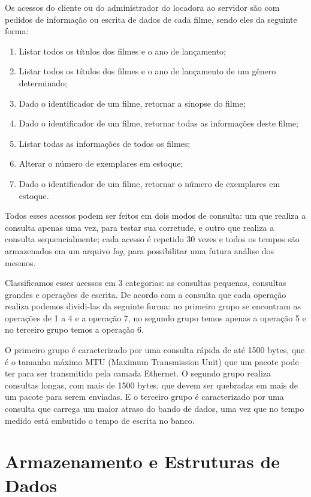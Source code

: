 \documentclass[12pt,a4paper]{article}
\newenvironment{myenumerate}{
\begin{enumerate}
 \setlength{\itemsep}{1pt}
 \setlength{\parskip}{0pt}
 \setlength{\parsep}{0pt}
}{\end{enumerate}}
\begin{document}
Os acessos do cliente ou do administrador do locadora ao servidor são com pedidos de informação ou escrita de dados de cada filme, sendo eles da seguinte forma:

\begin {myenumerate}
\item Listar todos os títulos dos filmes e o ano de lançamento;
\item Listar todos os títulos dos filmes e o ano de lançamento de um gênero determinado;
\item Dado o identificador de um filme, retornar a sinopse do filme;
\item Dado o identificador de um filme, retornar todas as informações deste filme;
\item Listar todas as informações de todos os filmes;
\item Alterar o número de exemplares em estoque;
\item Dado o identificador de um filme, retornar o número de exemplares
em estoque.
\end{myenumerate}

    Todos esses acessos podem ser feitos em dois modos de consulta: um que realiza a consulta apenas uma vez, para testar sua corretude, e outro que realiza a consulta sequencialmente; cada acesso é repetido 30 vezes e todos os tempos são armazenados em um arquivo {\it log}, para possibilitar uma futura análise dos mesmos.
    
    Classificamos esses acessos em 3 categorias: as consultas pequenas, consultas grandes e operações de escrita. De acordo com a consulta que cada operação realiza podemos dividi-las da seguinte forma: no primeiro grupo se encontram as operações de 1 a 4 e a operação 7, no segundo grupo temos apenas a operação 5 e no terceiro grupo temos a operação 6. 
    
O primeiro grupo é caracterizado por uma consulta rápida de até 1500 bytes, que é o tamanho máximo MTU (Maximum Transmission Unit) que um pacote pode ter para ser transmitido pela camada Ethernet. O segundo grupo realiza consultas longas, com mais de 1500 bytes, que devem ser quebradas em mais de um pacote para serem enviadas. E o terceiro grupo é caracterizado por uma consulta que carrega um maior atraso do bando de dados, uma vez que no tempo medido está embutido o tempo de escrita no banco.


\section{Armazenamento e Estruturas de Dados}
\end{document}
